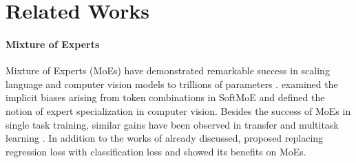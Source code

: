 \section{Related Works}
\label{sec:relatedWorks}

\paragraph{Mixture of Experts} Mixture of Experts (MoEs) have demonstrated remarkable success in scaling language and computer vision models to trillions of parameters \citep{lepikhin2020gshard, fedus2022switch, wang2020deep, yang2019condconv, abbas2020biased, pavlitskaya2020using}. %
\cite{chung2024beyond} examined the implicit biases arising from token combinations in SoftMoE and defined the notion of expert specialization in computer vision. Besides the success of MoEs in single task training, similar gains have been observed in transfer and multitask learning \citep{puigcerver2020scalable, chen2023mod, ye2023taskexpert,hazimeh2021dselect}. 
In addition to the works of  already discussed,
\cite{farebrother24classification} proposed replacing regression loss with classification loss and showed its benefits on MoEs. 



